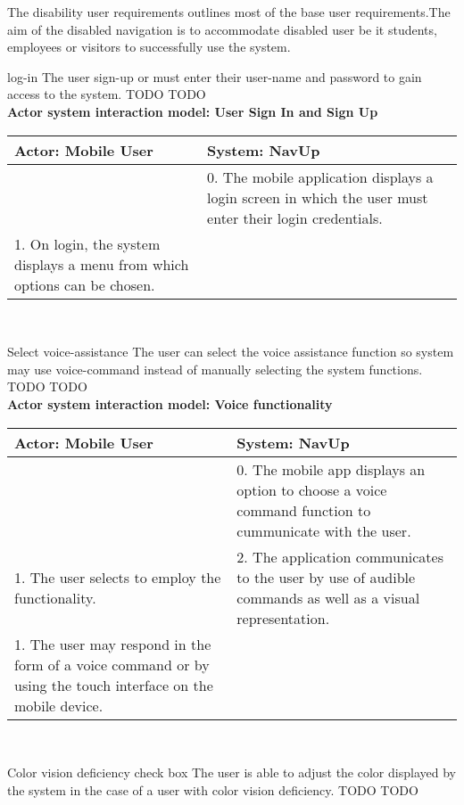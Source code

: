 The disability user requirements outlines most of the base user requirements.The aim of the disabled navigation is to accommodate disabled user be it students, employees or visitors to successfully use the system.

\FuncReq 
{log-in }
{The user sign-up or must enter their user-name and password to gain access to the system. }
 {TODO}
 {TODO}
     \\
    \textbf{Actor system interaction model: User Sign In and Sign Up }\\
    \begin{tabular}{ | p{6cm} | p{6cm} |}
    \hline
    Actor: Mobile User & System: NavUp \\ \hline
     & 0. The mobile application displays a login screen in which the user must enter their login credentials.\\ \hline
    1. On login, the system displays a menu from which options can be chosen. &\\ \hline   
    \end{tabular}
\\
\bigskip

\FuncReq
{Select voice-assistance }
{The user can select the voice assistance function so system may use voice-command instead of manually selecting the system functions.}
{TODO}
{TODO}
    \\
    \textbf{Actor system interaction model: Voice functionality }\\
    \begin{tabular}{ | p{6cm} | p{6cm} |}
    \hline
    Actor: Mobile User & System: NavUp \\ \hline
     & 0. The mobile app displays an option to choose a voice command function to cummunicate with the user.\\ \hline
    1. The user selects to employ the functionality. & 2. The application communicates to the user by use of audible commands as well as a visual representation.\\ \hline
    1. The user may respond in the form of a voice command or by using the touch interface on the mobile device. & \\ \hline
    
    \end{tabular}
\\
\bigskip

\FuncReq
{Color vision deficiency check box}
{The user is able to adjust the color displayed by the system in the case of a user with color vision deficiency.}
{TODO}
{TODO}

